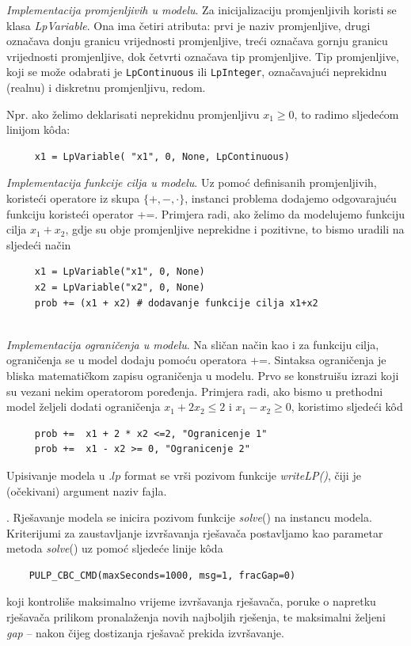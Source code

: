 \documentclass[a4paper, utf8, 11pt, colorlinks]{book}
\theoremstyle{definition}
\begin{document}
 {\emph{Implementacija promjenljivih u modelu}}.  Za inicijalizaciju promjenljivih koristi se klasa \emph{LpVariable}. Ona ima četiri atributa: prvi je naziv promjenljive, drugi označava donju granicu vrijednosti promjenljive, treći označava gornju granicu vrijednosti promjenljive, dok četvrti označava tip promjenljive. Tip promjenljive, koji se može odabrati je \texttt{LpContinuous} ili \texttt{LpInteger}, označavajući neprekidnu (realnu) i diskretnu promjenljivu, redom.  

Npr. ako želimo deklarisati neprekidnu promjenljivu $x_1\geq 0$, to radimo sljedećom linijom k\^oda:

\begin{verbatim}
	 x1 = LpVariable( "x1", 0, None, LpContinuous)
\end{verbatim}
 
  {\emph{Implementacija funkcije cilja u modelu}}. Uz pomoć definisanih promjenljivih, koristeći operatore iz skupa $\{+,-, \cdot\}$, instanci problema dodajemo odgovarajuću funkciju  koristeći operator +=. Primjera radi, ako želimo da modelujemo funkciju cilja $x_1 + x_2$, gdje su obje promjenljive neprekidne i pozitivne, to bismo uradili na sljedeći način
\begin{verbatim}
	 x1 = LpVariable("x1", 0, None)
	 x2 = LpVariable("x2", 0, None) 
	 prob += (x1 + x2) # dodavanje funkcije cilja x1+x2 
\end{verbatim} \\ \vspace{-1.5cm}
  {\emph{Implementacija ograničenja u modelu}}.  Na sličan način kao i za funkciju cilja, ograničenja se  u model dodaju pomoću operatora +=. Sintaksa ograničenja je bliska matematičkom zapisu ograničenja u modelu. Prvo se konstruišu izrazi koji su vezani nekim operatorom poređenja. Primjera radi, ako bismo u prethodni model željeli dodati ograničenja $x_1 + 2 x_2 \leq 2$ i $x_1-x_2 \geq 0$, koristimo sljedeći k\^od
\begin{verbatim}
	 prob +=  x1 + 2 * x2 <=2, "Ogranicenje 1"
	 prob +=  x1 - x2 >= 0, "Ogranicenje 2" 
\end{verbatim}
Upisivanje modela u .$lp$ format se vrši pozivom funkcije \emph{writeLP()}, čiji je (očekivani) argument naziv fajla. 

 . Rješavanje modela se inicira pozivom funkcije \emph{solve}() na instancu modela. Kriterijumi za zaustavljanje izvršavanja rješavača postavljamo kao parametar metoda \emph{solve}()  uz pomoć sljedeće linije k\^oda
 \begin{verbatim}
    PULP_CBC_CMD(maxSeconds=1000, msg=1, fracGap=0) 
\end{verbatim}
koji kontroliše maksimalno vrijeme izvršavanja rješavača, poruke o napretku rješavača prilikom pronalaženja novih najboljih rješenja, te maksimalni željeni \emph{gap} -- nakon čijeg dostizanja rješavač prekida izvršavanje.
\end{document}
